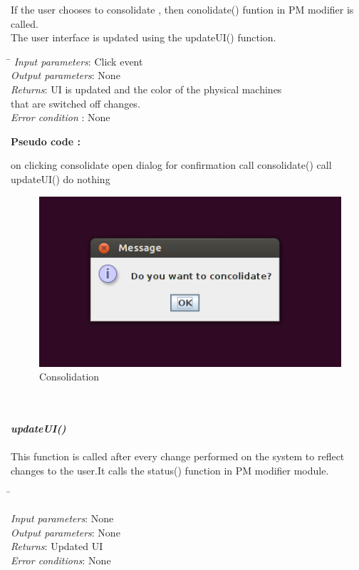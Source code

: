 ﻿\documentclass[a4paper,11pt]{article}
\begin{document}
If the user chooses to consolidate ,  then conolidate() funtion in PM modifier is called.
\\ The user interface is updated using the updateUI() function.
\\
  \begin{tabbing}
  \hspace*{4cm}\= \kill
\emph{Input parameters}\>: Click event
\\
\emph{Output parameters}\>: None \\
\emph{Returns}\>: UI is updated and the color of the physical machines\\ \> that are switched off changes.\\
\emph{Error condition} \>: None\\
\end{tabbing}
\textbf{Pseudo code :}
\begin{algorithmic}[1]
\STATE on clicking consolidate
\STATE open dialog for confirmation
\STATE call consolidate()
\STATE call updateUI()
\ELSE 
\STATE do nothing
\ENDIF
\end{algorithmic}
\begin{figure}[ht!]
\centering
\includegraphics[scale=0.6, angle=0]{5.png}
\caption{Consolidation}
\end{figure} 
\mbox{}\\\\
\emph{\bf updateUI()}\\\\
This function is called after every change performed on the system to reflect changes to the user.It calls the status() function in PM modifier module.
\\\begin{tabbing}
  \hspace*{4cm}\= \kill

\emph{Input parameters}\>: None
\\
\emph{Output parameters}\>: None\\
\emph{Returns}\>: Updated UI\\
\emph{Error conditions}\>: None\\
\end{tabbing}
\end{document}
